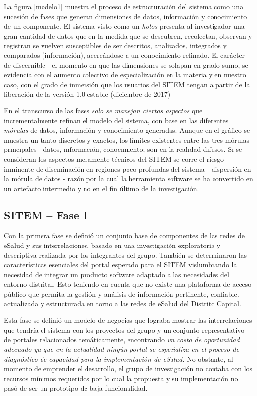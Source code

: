 La figura \ref{modelo1} muestra el proceso de estructuración del sistema como una sucesión de fases que generan dimensiones de datos, información y conocimiento de un componente. El sistema visto como un \textit{holos} presenta al investigador una gran cantidad de datos que en la medida que se descubren, recolectan, observan y registran se vuelven susceptibles de ser descritos, analizados, integrados y comparados (información), acercándose a un conocimiento refinado. El carácter de discernible - el momento en que las dimensiones se solapan en grado sumo, se evidencia con el aumento colectivo de especialización en la materia y en nuestro caso, con el grado de inmersión que los usuarios del SITEM tengan a partir de la liberación de la versión 1.0 estable (diciembre de 2017).

En el transcurso de las fases \textit{solo se manejan ciertos aspectos} que incrementalmente refinan el modelo del sistema, con base en las diferentes \textit{mórulas} de datos, información y conocimiento generadas. Aunque en el gráfico se muestra un tanto discretos y exactos, los límites existentes entre las tres mórulas principales - datos, información, conocimiento; son en la realidad difusos. Si se consideran los aspectos meramente técnicos del SITEM se corre el riesgo inminente de diseminación en regiones poco profundas del sistema - dispersión en la mórula de datos - razón por la cual la herramienta software se ha convertido en un artefacto intermedio y no en el fin último de la investigación.

\subsection{SITEM – Fase I}
Con la primera fase  se definió un conjunto base de componentes de las redes de eSalud y sus interrelaciones, basado en una investigación exploratoria y descriptiva realizada por los integrantes del grupo. También se determinaron las características esenciales del portal esperado para el SITEM vislumbrando la necesidad de integrar un producto software adaptado a las necesidades del entorno distrital. Esto teniendo en cuenta que no existe una plataforma de acceso público que permita la gestión y análisis de información pertinente, confiable, actualizada y estructurada en torno a las redes de eSalud del Distrito Capital.

Esta fase se definió un modelo de negocios que lograba mostrar las interrelaciones que tendría el sistema con los proyectos del grupo y un conjunto representativo de portales relacionados temáticamente, encontrando \textit{un costo de oportunidad adecuado ya que en la actualidad ningún portal se especializa en el proceso de diagnóstico de capacidad para la implementación de eSalud.} No obstante, al momento de emprender el desarrollo, el grupo de investigación no contaba con los recursos mínimos requeridos por lo cual la propuesta y su implementación no pasó de ser un prototipo de baja funcionalidad. 


